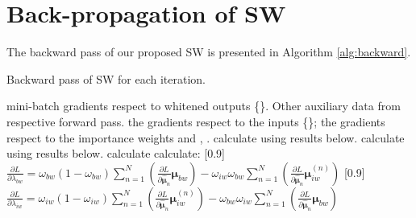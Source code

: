 \documentclass[10pt,twocolumn,letterpaper]{article}
\begin{document}
\section{Back-propagation of SW}

The backward pass of our proposed SW is presented in Algorithm \ref{alg:backward}.
\vspace{-8pt}
\begin{algorithm}[h]
	\caption{Backward pass of SW for each iteration.}
	\label{alg:backward}
	{\fontsize{9}{9} \selectfont
		\begin{algorithmic}[1]
			 mini-batch gradients respect to whitened outputs \{\}. Other auxiliary data from respective forward pass.
 the gradients respect to the inputs \{\};
			the gradients respect to the importance weights  and , .
			\State calculate  using results below.
\State calculate  using results below.
\EndFor
			\State calculate 
\EndFor
			\State calculate: \linebreak
			\scalebox{0.85}[0.9]{
				\( \frac{\partial L}{\partial \lambda_{bw}} = \omega_{bw}(1 - \omega_{bw}) \sum_{n=1}^{N} (\frac{\partial L}{\partial \bm{\hat{\mu}}_n} \bm{\mu}_{bw} ) - \omega_{iw}\omega_{bw} \sum_{n=1}^{N} (\frac{\partial L}{\partial \bm{\hat{\mu}}_n} \bm{\mu}_{iw}^{(n)} ) \)
			}
			\scalebox{0.85}[0.9]{
				\( \frac{\partial L}{\partial \lambda_{iw}} = \omega_{iw}(1 - \omega_{iw}) \sum_{n=1}^{N} (\frac{\partial L}{\partial \bm{\hat{\mu}}_n} \bm{\mu}_{iw}^{(n)} ) - \omega_{bw}\omega_{iw} \sum_{n=1}^{N} (\frac{\partial L}{\partial \bm{\hat{\mu}}_n} \bm{\mu}_{bw} ) \)
}
\end{algorithmic}}
\end{algorithm}
\end{document}
